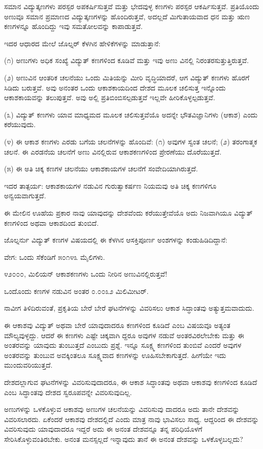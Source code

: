 ಸಮಾನ ವಿದ್ಯುತ್ಕಣಗಳು ಪರಸ್ಪರ ಅಪಕರ್ಷಿಸುತ್ತವೆ ಮತ್ತು ಭೇದವುಳ್ಳ ಕಣಗಳು ಪರಸ್ಪರ ಆಕರ್ಷಿಸುತ್ತವೆ. ಪ್ರತಿಯೊಂದು ಅಣುವೂ ಸಮಾನ ಪ್ರಮಾಣದ ವಿದ್ಯುತ್ಕಣಗಳನ್ನು ಹೊಂದಿರುತ್ತವೆ, ಅದಲ್ಲದೆ ಮಿಗುತಾಯವಾದ ಧನ ಮತ್ತು ಋಣ ಕಣಗಳನ್ನೂ ಹೊಂದಿದ್ದು ಇವು ಸಮತೋಲವನ್ನು ಕಾಪಾಡುತ್ತವೆ.

ಇದರ ಆಧಾರದ ಮೇಲೆ ಜೊಲ್ನರ್ ಕೆಳಗಿನ ಹೇಳಿಕೆಗಳನ್ನು ಮಾಡುತ್ತಾನೆ:

(೧) ಅಣುಗಳು ಅಧಿಕ ಸಂಖ್ಯೆ ವಿದ್ಯುತ್ ಕಣಗಳಿಂದ ಕೂಡಿವೆ ಮತ್ತು ಇವು ಅಣು ವಿನಲ್ಲಿ ನಿರಂತರಸುತ್ತುತ್ತಿರುತ್ತವೆ.

(೨) ಅಣುವಿನ ಆಂತರಿಕ ಚಲನೆಯು ಒಂದು ಮಿತಿಯನ್ನು ಮೀರಿ ವೃದ್ಧಿಯಾದರೆ, ಆಗ ವಿದ್ಯುತ್ ಕಣಗಳು ಹೊರಗೆ ಸಿಡಿದು ಬರುತ್ತವೆ. ಅವು ಅನಂತರ ಒಂದು ಆಕಾಶಕಾಯದಿಂದ ದೇಶದ  ಮೂಲಕ ಚಲಿಸುತ್ತ ಇನ್ನೊಂದು ಆಕಾಶಕಾಯವನ್ನು ತಲುಪುತ್ತವೆ. ಅವು ಅಲ್ಲಿ ಪ್ರತಿಬಿಂಬಿಸಲ್ಪಡುತ್ತವೆ ಇಲ್ಲವೇ ಹೀರಿಕೊಳ್ಳಲ್ಪಡುತ್ತವೆ.

(೩) ವಿದ್ಯುತ್ ಕಣಗಳು ಯಾವ ಮಾಧ್ಯಮದ ಮೂಲಕ ಚಲಿಸುತ್ತವೆಯೊ ಅದನ್ನೇ ಭೌತವಿಜ್ಞಾನಿಗಳು  (ಆಕಾಶ) ಎಂದು ಕರೆಯುವುದು.

(೪) ಈ ಆಕಾಶ ಕಣಗಳು ಎರಡು ಬಗೆಯ ಚಲನೆಗಳನ್ನು ಹೊಂದಿವೆ: (೧) ಅವುಗಳ ಸ್ವಂತ ಚಲನೆ; (೨) ತರಂಗಾತ್ಮಕ ಚಲನೆ. ಈ ಎರಡನೆಯ ಚಲನೆಗೆ ಅಣು ವಿನಲ್ಲಿರುವ ಆಕಾಶಕಣಗಳಿಂದ ಪ್ರೇರಣೆಯು ದೊರೆಯುತ್ತದೆ.

(೫) ಈ ಅತಿ ಚಿಕ್ಕ ಕಣಗಳ ಚಲನೆಯು ಆಕಾಶಕಾಯಗಳ ಚಲನೆಗೆ ಸಂವೇದಿಯಾಗಿರುತ್ತದೆ.

ಇದರ ತಾತ್ಪರ್ಯ: ಆಕಾಶಕಾಯಗಳ ನಡುವಿನ ಗುರುತ್ವಾಕರ್ಷಣ ನಿಯಮವು ಅತಿ ಚಿಕ್ಕ ಕಣಗಳಿಗೂ ಅನ್ವಯವಾಗುತ್ತದೆ.

ಈ ಮೇಲಿನ ಊಹೆಯ ಪ್ರಕಾರ ನಾವು ಯಾವುದನ್ನು ದೇಶವೆಂದು  ಕರೆಯುತ್ತೇವೆಯೊ ಅದು ನಿಜವಾಗಿಯೂ ವಿದ್ಯುತ್ ಕಣಗಳಿಂದ ಅಥವಾ ಆಕಾಶದಿಂದ ತುಂಬಿದೆ.

ಜೊಲ್ನರ್ನು ವಿದ್ಯುತ್ ಕಣಗಳ ವಿಷಯದಲ್ಲಿ ಈ ಕೆಳಗಿನ ಆಸಕ್ತಿಪೂರ್ಣ ಅಂಶಗಳನ್ನು ಕಂಡುಹಿಡಿದಿದ್ದಾನೆ:

ವೇಗ: ಒಂದು ಸೆಕೆಂಡಿಗೆ ೫೦೧೪೩ ಮೈಲಿಗಳು.

೪೨೦೦೦, ಮಿಲಿಯನ್ ಆಕಾಶಕಣಗಳು ಒಂದು ನೀರಿನ ಅಣುವಿನಲ್ಲಿರುತ್ತವೆ!

ಒಂದೊಂದು ಕಣಗಳ ನಡುವಿನ ಅಂತರ ೦.೦೦೩೨ ಮಿಲಿಮೀಟರ್.

ನಾವೀಗ ತಿಳಿದಿರುವಂತೆ, ಪ್ರಕೃತಿಯ ಬೇರೆ ಬೇರೆ ಘಟನೆಗಳನ್ನು ವಿವರಿಸಲು ಆಕಾಶ ಸಿದ್ಧಾಂತವು ಅತ್ಯುತ್ತಮವಾದುದು.

ಈ ಆಕಾಶವು ವಿದ್ಯುತ್ ಅಥವಾ ಬೇರೆ ಯಾವುದಾದರೂ ಕಣಗಳಿಂದ ಕೂಡಿದೆ ಎಂಬ ವಿಷಯವೂ ಅತ್ಯಂತ ಮೌಲ್ಯವುಳ್ಳದ್ದು. ಆದರೆ ಈ ಕಣಗಳು ಎಷ್ಟೇ ಚಿಕ್ಕವಾಗಿ ದ್ದರೂ ಅವುಗಳ ನಡುವೆ ಅಂತರವಿರಲೇಬೇಕು ಮತ್ತು ಈ ಅಂತರವನ್ನು ಯಾವುದು ತುಂಬುತ್ತದೆ ಎಂಬುದು ಪ್ರಶ್ನೆ. ಇನ್ನೂ ಸೂಕ್ಷ್ಮ ಕಣಗಳಿಂದ ತುಂಬಿವೆ ಎಂದರೆ ಅವುಗಳ ಅಂತರವನ್ನು ತುಂಬುವ ಅವಕ್ಕಿಂತಲೂ ಸೂಕ್ಷ್ಮವಾದ ಕಣಗಳನ್ನು ಊಹಿಸಬೇಕಾಗುತ್ತದೆ. ಹೀಗೆಯೇ ಇದು ಮುಂದುವರಿಯುತ್ತದೆ.

ದೇಶದಲ್ಲಾಗುವ ಘಟನೆಗಳನ್ನು ವಿವರಿಸುವುದಾದರೂ, ಈ ಆಕಾಶ ಸಿದ್ಧಾಂತವು ಅಥವಾ ಆಕಾಶವು ಕಣಗಳಿಂದ ಕೂಡಿದೆ ಎಂಬ ಸಿದ್ಧಾಂತವು ದೇಶದ ಸ್ವರೂಪವನ್ನೇ ವಿವರಿಸುವುದಿಲ್ಲ.

ಅಣುಗಳನ್ನು ಒಳಕೊಳ್ಳುವ ಆಕಾಶವು ಅಣುಗಳ ಚಲನೆಯನ್ನು ವಿವರಿಸುವು ದಾದರೂ ಅದು ತಾನೇ ದೇಶವನ್ನು ವಿವರಿಸಲಾರದು. ಏಕೆಂದರೆ ಆಕಾಶವು ದೇಶದಲ್ಲಿದೆ ಎಂದು ಮಾತ್ರ ನಾವು ಭಾವಿಸಲು ಸಾಧ್ಯ. ಆದ್ದರಿಂದ ಈ ದೇಶವನ್ನು ವಿವರಿಸುವುದು ಯಾವುದಾದರೂ ಇದ್ದರೆ ಅದು ಈ ಅನಂತ ದೇಶವನ್ನೂ ತನ್ನ ಪರಿಧಿಯೊಳಗೆ ಸೇರಿಸಿಕೊಳ್ಳುವಂತಿರಬೇಕು. ಅನಂತ ಮನಸ್ಸಲ್ಲದೆ ಇನ್ನಾವುದು ತಾನೆ ಈ ಅನಂತ ದೇಶವನ್ನು ಒಳಕೊಳ್ಳಬಲ್ಲದು?

